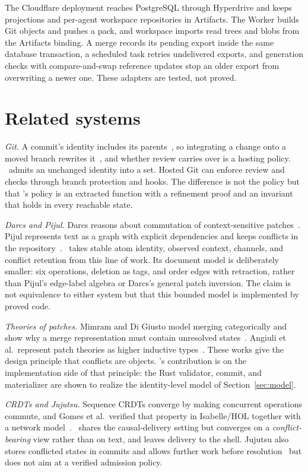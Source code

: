 The Cloudflare deployment reaches PostgreSQL through Hyperdrive and keeps projections and per-agent workspace repositories in Artifacts. The Worker builds Git objects and pushes a pack, and workspace imports read trees and blobs from the Artifacts binding. A merge records its pending export inside the same database transaction, a scheduled task retries undelivered exports, and generation checks with compare-and-swap reference updates stop an older export from overwriting a newer one. These adapters are tested, not proved.

\section{Related systems}\label{sec:related}
\emph{Git.} A commit's identity includes its parents~\cite{gitobjects}, so integrating a change onto a moved branch rewrites it~\cite{gitrebase}, and whether review carries over is a hosting policy. \sys\ admits an unchanged identity into a set. Hosted Git can enforce review and checks through branch protection and hooks. The difference is not the policy but that \sys's policy is an extracted function with a refinement proof and an invariant that holds in every reachable state.

\emph{Darcs and Pijul.} Darcs reasons about commutation of context-sensitive patches~\cite{darcs}. Pijul represents text as a graph with explicit dependencies and keeps conflicts in the repository~\cite{pijul}. \sys\ takes stable atom identity, observed context, channels, and conflict retention from this line of work. Its document model is deliberately smaller: six operations, deletion as tags, and order edges with retraction, rather than Pijul's edge-label algebra or Darcs's general patch inversion. The claim is not equivalence to either system but that this bounded model is implemented by proved code.

\emph{Theories of patches.} Mimram and Di Giusto model merging categorically and show why a merge representation must contain unresolved states~\cite{patches}. Angiuli et al.\ represent patch theories as higher inductive types~\cite{homotopical}. These works give the design principle that conflicts are objects. \sys's contribution is on the implementation side of that principle: the Rust validator, commit, and materializer are shown to realize the identity-level model of Section~\ref{sec:model}.

\emph{CRDTs and Jujutsu.} Sequence CRDTs converge by making concurrent operations commute, and Gomes et al.\ verified that property in Isabelle/HOL together with a network model~\cite{sec}. \sys\ shares the causal-delivery setting but converges on a \emph{conflict-bearing} view rather than on text, and leaves delivery to the shell. Jujutsu also stores conflicted states in commits and allows further work before resolution~\cite{jj} but does not aim at a verified admission policy.


